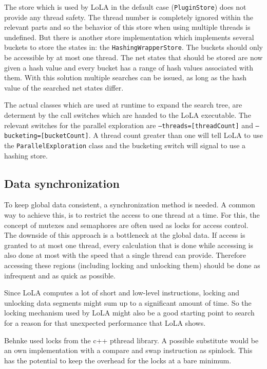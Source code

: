 The store which is used by LoLA in the default case (\texttt{PluginStore}) does not provide any thread safety. The thread number is completely ignored within the relevant parts and so the behavior of this store when using multiple threads is undefined. But there is another store implementation which implements several buckets to store the states in: the \texttt{HashingWrapperStore}. The buckets should only be accessible by at most one thread. The net states that should be stored are now given a hash value and every bucket has a range of hash values associated with them. With this solution multiple searches can be issued, as long as the hash value of the searched net states differ.

The actual classes which are used at runtime to expand the search tree, are determent by the call switches which are handed to the LoLA executable. The relevant switches for the parallel exploration are \texttt{--threads=[threadCount]} and \texttt{--bucketing=[bucketCount]}. A thread count greater than one will tell LoLA to use the \texttt{ParallelExploration} class and the bucketing switch will signal to use a hashing store.

\subsection{Data synchronization}
To keep global data consistent, a synchronization method is needed. A common way to achieve this, is to restrict the access to one thread at a time. For this, the concept of mutexes and semaphores are often used as locks for access control. The downside of this approach is a bottleneck at the global data. If access is granted to at most one thread, every calculation that is done while accessing is also done at most with the speed that a single thread can provide. Therefore accessing these regions (including locking and unlocking them) should be done as infrequent and as quick as possible.

Since LoLA computes a lot of short and low-level instructions, locking and unlocking data segments might sum up to a significant amount of time. So the locking mechanism used by LoLA might also be a good starting point to search for a reason for that unexpected performance that LoLA shows.

Behnke used locks from the c++ pthread library. A possible substitute would be an own implementation with a compare and swap instruction as spinlock. This has the potential to keep the overhead for the locks at a bare minimum.

